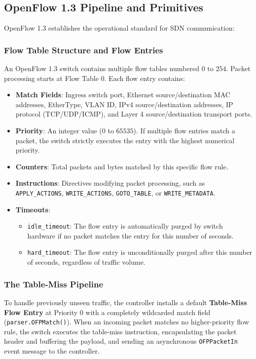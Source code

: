 \subsection{OpenFlow 1.3 Pipeline and Primitives}
OpenFlow 1.3 \cite{onf2012openflow} establishes the operational standard for SDN communication:

\subsubsection{Flow Table Structure and Flow Entries}
An OpenFlow 1.3 switch contains multiple flow tables numbered $0$ to $254$. Packet processing starts at Flow Table 0. Each flow entry contains:
\begin{itemize}
    \item \textbf{Match Fields}: Ingress switch port, Ethernet source/destination MAC addresses, EtherType, VLAN ID, IPv4 source/destination addresses, IP protocol (TCP/UDP/ICMP), and Layer 4 source/destination transport ports.
    \item \textbf{Priority}: An integer value ($0$ to $65535$). If multiple flow entries match a packet, the switch strictly executes the entry with the highest numerical priority.
    \item \textbf{Counters}: Total packets and bytes matched by this specific flow rule.
    \item \textbf{Instructions}: Directives modifying packet processing, such as \texttt{APPLY\_ACTIONS}, \texttt{WRITE\_ACTIONS}, \texttt{GOTO\_TABLE}, or \texttt{WRITE\_METADATA}.
    \item \textbf{Timeouts}:
    \begin{itemize}
        \item \texttt{idle\_timeout}: The flow entry is automatically purged by switch hardware if no packet matches the entry for this number of seconds.
        \item \texttt{hard\_timeout}: The flow entry is unconditionally purged after this number of seconds, regardless of traffic volume.
    \end{itemize}
\end{itemize}

\subsubsection{The Table-Miss Pipeline}
To handle previously unseen traffic, the controller installs a default \textbf{Table-Miss Flow Entry} at Priority 0 with a completely wildcarded match field (\texttt{parser.OFPMatch()}). When an incoming packet matches no higher-priority flow rule, the switch executes the table-miss instruction, encapsulating the packet header and buffering the payload, and sending an asynchronous \texttt{OFPPacketIn} event message to the controller.

